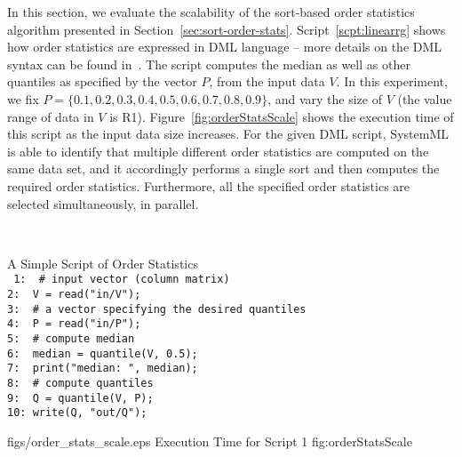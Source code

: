 
In this section, we evaluate the scalability of the sort-based order statistics algorithm presented in Section~\ref{sec:sort-order-stats}. Script~\ref{scpt:linearrg} shows how order statistics are expressed in DML language -- more details on the DML syntax can be found in~\cite{systemml}. The script computes the median as well as other quantiles as specified by the vector $P$, from the input data $V$. In this experiment, we fix $P=\{0.1, 0.2, 0.3, 0.4, 0.5, 0.6, 0.7, 0.8, 0.9\}$, and vary the size of $V$ (the value range of data in $V$ is R1). Figure~\ref{fig:orderStatsScale} shows the execution time of this script as the input data size increases. For the given DML script, SystemML is able to identify that multiple different order statistics are computed on the same data set, and it accordingly performs a single sort and then computes the required order statistics. Furthermore, all the specified order statistics are selected simultaneously, in parallel.

\
\begin{script}\label{scpt:linearrg}
A Simple Script of Order Statistics\\
\footnotesize
\texttt{
1:\ \ \# input vector (column matrix)\\
2:\ \ V = read("in/V");\\
3:\ \ \# a vector specifying the desired quantiles \\
4:\ \ P = read("in/P");\\
5:\ \ \# compute median\\
6:\ \ median = quantile(V, 0.5);\\
7:\ \ print("median: ", median);\\
8:\ \ \# compute quantiles\\
9:\ \ Q = quantile(V, P);\\
10:\ write(Q, "out/Q");\\}
\end{script}

\onefigure
{figs/order_stats_scale.eps}
{Execution Time for Script 1}
{fig:orderStatsScale}
